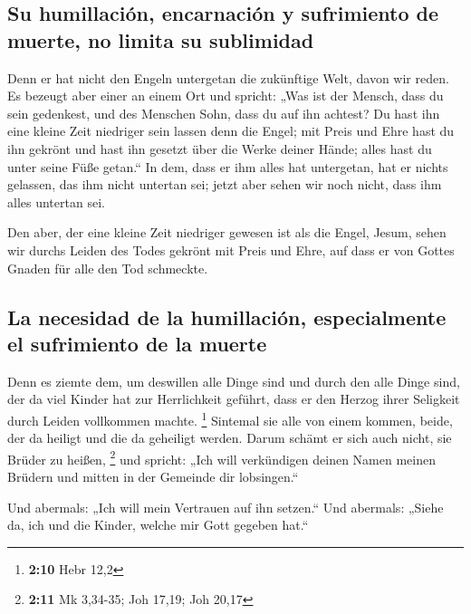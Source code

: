 \hypertarget{su-humillaciuxf3n-encarnaciuxf3n-y-sufrimiento-de-muerte-no-limita-su-sublimidad}{%
\subsection{Su humillación, encarnación y sufrimiento de muerte, no
limita su
sublimidad}\label{su-humillaciuxf3n-encarnaciuxf3n-y-sufrimiento-de-muerte-no-limita-su-sublimidad}}

 Denn er hat nicht den Engeln untergetan die zukünftige
Welt, davon wir reden.  Es bezeugt aber einer an einem Ort
und spricht: „Was ist der Mensch, dass du sein gedenkest, und des
Menschen Sohn, dass du auf ihn achtest?  Du hast ihn eine
kleine Zeit niedriger sein lassen denn die Engel; mit Preis und Ehre
hast du ihn gekrönt und hast ihn gesetzt über die Werke deiner Hände;
 alles hast du unter seine Füße getan.`` In dem, dass er
ihm alles hat untergetan, hat er nichts gelassen, das ihm nicht untertan
sei; jetzt aber sehen wir noch nicht, dass ihm alles untertan sei.

 Den aber, der eine kleine Zeit niedriger gewesen ist als
die Engel, Jesum, sehen wir durchs Leiden des Todes gekrönt mit Preis
und Ehre, auf dass er von Gottes Gnaden für alle den Tod schmeckte.

\hypertarget{la-necesidad-de-la-humillaciuxf3n-especialmente-el-sufrimiento-de-la-muerte}{%
\subsection{La necesidad de la humillación, especialmente el sufrimiento
de la
muerte}\label{la-necesidad-de-la-humillaciuxf3n-especialmente-el-sufrimiento-de-la-muerte}}

 Denn es ziemte dem, um deswillen alle Dinge sind und
durch den alle Dinge sind, der da viel Kinder hat zur Herrlichkeit
geführt, dass er den Herzog ihrer Seligkeit durch Leiden vollkommen
machte. \footnote{\textbf{2:10} Hebr 12,2}  Sintemal sie
alle von einem kommen, beide, der da heiligt und die da geheiligt
werden. Darum schämt er sich auch nicht, sie Brüder zu heißen,
\footnote{\textbf{2:11} Mk 3,34-35; Joh 17,19; Joh 20,17}
 und spricht: „Ich will verkündigen deinen Namen meinen
Brüdern und mitten in der Gemeinde dir lobsingen.``

 Und abermals: „Ich will mein Vertrauen auf ihn setzen.``
Und abermals: „Siehe da, ich und die Kinder, welche mir Gott gegeben
hat.``


